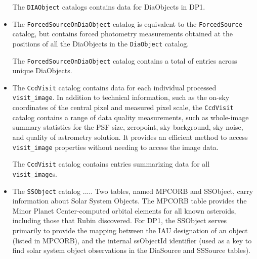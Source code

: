 \begin{itemize}
The \texttt{DIAObject} catalogs contains data for \ndiaobjects DiaObjects in \gls{DP1}.


\item The \texttt{ForcedSourceOnDiaObject} catalog \citep{10.71929/rubin/2570321} is equivalent to the \texttt{ForcedSource} catalog, but contains \gls{forced photometry} measurements obtained at the positions of all the DiaObjects in the \texttt{DiaObject} catalog.

The \texttt{ForcedSourceOnDiaObject} catalog  contains a total of \ndiaforcedsources entries across \ndiaforcedobjects unique DiaObjects.


\item The \texttt{CcdVisit} catalog \citep{10.71929/rubin/2570331} contains data for each individual processed \texttt{visit\_image}.
In addition to technical information, such as the on-sky coordinates of the central pixel and measured pixel scale, the \texttt{CcdVisit} catalog contains a range of data quality measurements, such as whole-image summary statistics for the \gls{PSF} size, zeropoint, sky \gls{background}, sky noise, and quality of \gls{astrometry} solution.
It provides an efficient method to access  \texttt{visit\_image} properties without needing to access the image data.

The \texttt{CcdVisit} catalog contains entries summarizing data for all \nvisitdetectorsummaries \texttt{visit\_image}s.

\item The \texttt{SSObject} catalog \citep{10.71929/rubin/2570335}..... Two tables, named \gls{MPCORB} and SSObject, carry information about Solar System Objects. The \gls{MPCORB} table provides the Minor Planet \gls{Center}-computed orbital elements for all known asteroids, including those that Rubin discovered. 
For DP1, the SSObject serves primarily to provide the mapping between the \gls{IAU} designation of an object (listed in \gls{MPCORB}), and the internal ssObjectId identifier (used as a key to find solar system object observations in the DiaSource and SSSource tables).


\end{itemize}
